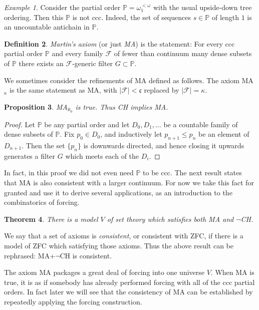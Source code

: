 \documentclass[11pt,oneside]{amsbook}
\newcommand{\PP}{\mathbb P}
\theoremstyle{definition}
\theoremstyle{plain}
\newtheorem{theorem}{Theorem}[section]
\newtheorem{proposition}[theorem]{Proposition}
\theoremstyle{definition}
\newtheorem{definition}[theorem]{Definition}
\theoremstyle{remark}
\newtheorem{example}[theorem]{Example}
\numberwithin{equation}{section}
\numberwithin{figure}{section}
\begin{document}
\begin{example}
  Consider the partial order $\PP=\omega_1^{<\omega}$ with the usual upside-down tree ordering. Then this $\PP$ is not ccc. Indeed, the set of sequences $s\in\PP$ of length $1$ is an uncountable antichain in $\PP$.
\end{example}

\begin{definition}
  \emph{Martin's axiom} (or just \emph{MA}) is the statement: For every ccc partial order $\PP$ and every family $\mathcal F$ of fewer than continuum many dense subsets of $\PP$ there exists an $\mathcal F$-generic filter $G\subset\PP$.
\end{definition}

We sometimes consider the refinements of MA defined as follows. The axiom MA$_\kappa$ is the same statement as MA, with $|\mathcal F|<\mathfrak c$ replaced by $|\mathcal F|=\kappa$.

\begin{proposition}
  \label{prop:ma-aleph0}
  MA$_{\aleph_0}$ is true. Thus CH implies MA.
\end{proposition}

\begin{proof}
  Let $\PP$ be any partial order and let $D_0,D_1,\ldots$ be a countable family of dense subsets of $\PP$. Fix $p_0\in D_0$, and inductively let $p_{n+1}\leq p_n$ be an element of $D_{n+1}$. Then the set $\{p_n\}$ is downwards directed, and hence closing it upwards generates a filter $G$ which meets each of the $D_i$.
\end{proof}

In fact, in this proof we did not even need $\PP$ to be ccc. The next result states that MA is also consistent with a larger continuum. For now we take this fact for granted and use it to derive several applications, as an introduction to the combinatorics of forcing. 

\begin{theorem}
  There is a model $V$ of set theory which satisfies both MA and $\neg$CH.
\end{theorem}

We say that a set of axioms is \emph{consistent}, or consistent with ZFC, if there is a model of ZFC which satisfying those axioms. Thus the above result can be rephrased: MA+$\neg$CH is consistent.

The axiom MA packages a great deal of forcing into one universe $V$. When MA is true, it is as if somebody has already performed forcing with all of the ccc partial orders. In fact later we will see that the consistency of MA can be established by repeatedly applying the forcing construction.
\end{document}
